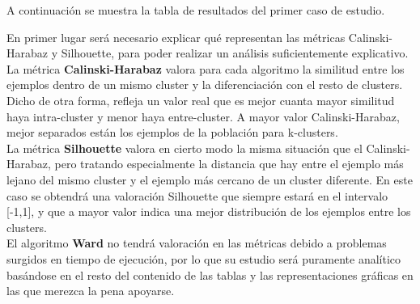 	A continuación se muestra la tabla de resultados del primer caso de estudio.
	
	\begin{table}[H]
		\centering
		\caption{Resultados de los algoritmos de clustering para el primer caso de estudio.}
		\label{tablaTodos1}
	\end{table}

	En primer lugar será necesario explicar qué representan las métricas Calinski-Harabaz y Silhouette, para poder realizar un análisis suficientemente explicativo.\\
	
	La métrica \textbf{Calinski-Harabaz} valora para cada algoritmo la similitud entre los ejemplos dentro de un mismo cluster y la diferenciación con el resto de clusters. Dicho de otra forma, refleja un valor real que es mejor cuanta mayor similitud haya intra-cluster y menor haya entre-cluster. A mayor valor Calinski-Harabaz, mejor separados están los ejemplos de la población para k-clusters.\\
	
	La métrica \textbf{Silhouette} valora en cierto modo la misma situación que el Calinski-Harabaz, pero tratando especialmente la distancia que hay entre el ejemplo más lejano del mismo cluster y el ejemplo más cercano de un cluster diferente. En este caso se obtendrá una valoración Silhouette que siempre estará en el intervalo [-1,1], y que a mayor valor indica una mejor distribución de los ejemplos entre los clusters.\\

	El algoritmo \textbf{Ward} no tendrá valoración en las métricas debido a problemas surgidos en tiempo de ejecución, por lo que su estudio será puramente analítico basándose en el resto del contenido de las tablas y las representaciones gráficas en las que merezca la pena apoyarse.


